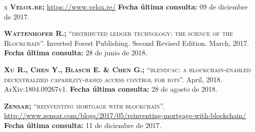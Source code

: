 \begin{thebibliography} {x}
	 \textsc{\textbf{Velox.re; }} 
	\url{https://www.velox.re/}
	\newline \textbf{Fecha última consulta:} 09 de diciembre de 2017.
	
	 \textsc{\textbf{Wattenhofer R.; }}\textsc{“distributed ledger technology: the science of the Blockchain”.} Inverted Forest Publishing. Second Revised Edition. March, 2017.
	\newline \textbf{Fecha última consulta:} 28 de junio de 2018.
	
	 \textsc{\textbf{Xu R., Chen Y., Blasch E. \& Chen G.; }} \textsc{“blendcac: a blockchain-enabled decentralized capability-based access control for iots”.} April, 2018. ArXiv:1804.09267v1.
	\newline \textbf{Fecha última consulta:} 28 de agosto de 2018.
	
	 \textsc{\textbf{Zensar; }} \textsc{“reinventing mortgage with blockchain”.}
	\url{http://www.zensar.com/blogs/2017/05/reinventing-mortgage-with-blockchain/}
	\newline \textbf{Fecha última consulta:} 11 de diciembre de 2017.
						
						
	\endgroup
\end{thebibliography}